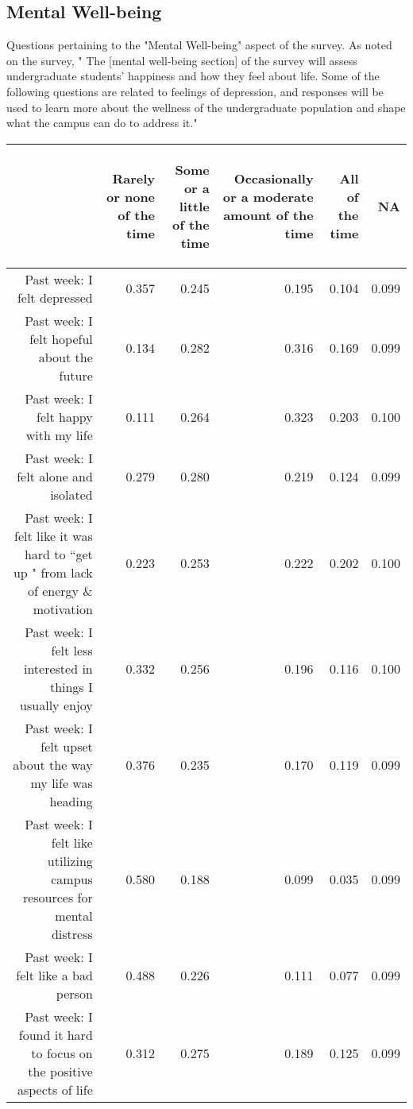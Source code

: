 \documentclass{article}\usepackage[]{graphicx}\usepackage[]{color}
\begin{document}
\subsection{Mental Well-being}
Questions pertaining to the "Mental Well-being" aspect of the survey. As noted on the survey, "
The [mental well-being section] of the survey will assess undergraduate students’ happiness
and how they feel about life.  Some of the following questions are related to
feelings of depression, and responses will be used to learn more about the
wellness of the undergraduate population and shape what the campus can do to
address it."
\begin{table}[ht]
\centering
\begin{tabular}{rrrrrr}
  \hline
 & \begin{sideways} Rarely or none of the time \end{sideways} & \begin{sideways} Some or a little of the time \end{sideways} & \begin{sideways} Occasionally or a moderate amount of the time \end{sideways} & \begin{sideways} All of the time \end{sideways} & \begin{sideways} NA \end{sideways} \\ 
  \hline
Past week: I felt depressed & 0.357 & 0.245 & 0.195 & 0.104 & 0.099 \\ 
  Past week: I felt hopeful about the future & 0.134 & 0.282 & 0.316 & 0.169 & 0.099 \\ 
  Past week: I felt happy with my life & 0.111 & 0.264 & 0.323 & 0.203 & 0.100 \\ 
  Past week: I felt alone and isolated & 0.279 & 0.280 & 0.219 & 0.124 & 0.099 \\ 
  Past week: I felt like it was hard to ``get up " from lack of energy \& motivation & 0.223 & 0.253 & 0.222 & 0.202 & 0.100 \\ 
  	Past week: I felt less interested in things I usually enjoy & 0.332 & 0.256 & 0.196 & 0.116 & 0.100 \\ 
  	Past week: I felt upset about the way my life was heading & 0.376 & 0.235 & 0.170 & 0.119 & 0.099 \\ 
  Past week: I felt like utilizing campus resources for mental distress & 0.580 & 0.188 & 0.099 & 0.035 & 0.099 \\ 
  Past week: I felt like a bad person & 0.488 & 0.226 & 0.111 & 0.077 & 0.099 \\ 
  Past week: I found it hard to focus on the positive aspects of life & 0.312 & 0.275 & 0.189 & 0.125 & 0.099 \\ 
   \hline
\end{tabular}
\end{table}
\end{document}

